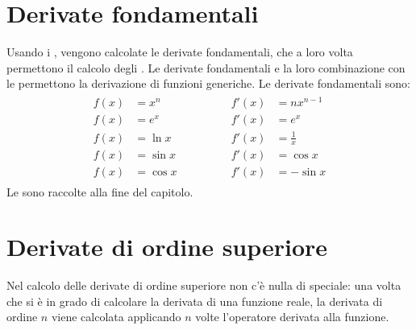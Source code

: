 \documentclass[letterpaper,10pt,italian]{jupyterBook}
\begin{document}
\section{Derivate fondamentali}
\label{\detokenize{ch/infinitesimal_calculus/derivatives:derivate-fondamentali}}\label{\detokenize{ch/infinitesimal_calculus/derivatives:infinitesimal-calculus-derivatives-fund}}
\sphinxAtStartPar
Usando i {\hyperref[\detokenize{ch/infinitesimal_calculus/analysis:infinitesimal-calculus-limits-fund}]{}}, vengono calcolate le derivate fondamentali, che a loro volta permettono il calcolo degli {\hyperref[\detokenize{ch/infinitesimal_calculus/integrals:infinitesimal-calculus-integrals-fund}]{}}. Le derivate fondamentali e la loro combinazione con le {\hyperref[\detokenize{ch/infinitesimal_calculus/derivatives:infinitesimal-calculus-derivatives-rules}]{}} permettono la derivazione di funzioni generiche. Le derivate fondamentali sono:
\begin{equation}\label{equation:ch/infinitesimal_calculus/derivatives:eq:infinitesimal-calculus:derivatives:fund}
\begin{split}\begin{aligned}
f(x) & = x^n    \qquad & \qquad f'(x) & = n x^{n-1}   \\ 
f(x) & = e^x    \qquad & \qquad f'(x) & = e^x         \\ 
f(x) & = \ln x  \qquad & \qquad f'(x) & = \frac{1}{x} \\ 
f(x) & = \sin x \qquad & \qquad f'(x) & = \cos x      \\ 
f(x) & = \cos x \qquad & \qquad f'(x) & =-\sin x         
\end{aligned}\end{split}
\end{equation}
\sphinxAtStartPar
Le {\hyperref[\detokenize{ch/infinitesimal_calculus/derivatives-notes:infinitesimal-calculus-derivatives-fund-notes}]{}} sono raccolte alla fine del capitolo.


\section{Derivate di ordine superiore}
\label{\detokenize{ch/infinitesimal_calculus/derivatives:derivate-di-ordine-superiore}}\label{\detokenize{ch/infinitesimal_calculus/derivatives:infinitesimal-calculus-derivatives-higher}}
\sphinxAtStartPar
Nel calcolo delle derivate di ordine superiore non c’è nulla di speciale: una volta che si è in grado di calcolare la derivata di una funzione reale, la derivata di ordine \(n\) viene calcolata applicando \(n\) volte l’operatore derivata alla funzione.
\end{document}
